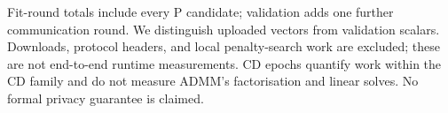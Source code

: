 Fit-round totals include every P candidate; validation adds one further
communication round. We distinguish uploaded vectors from validation scalars.
Downloads, protocol headers, and local penalty-search work are excluded;
these are not end-to-end runtime measurements. CD epochs quantify work
within the CD family and do not measure ADMM's factorisation and linear
solves. No formal privacy guarantee is claimed.
